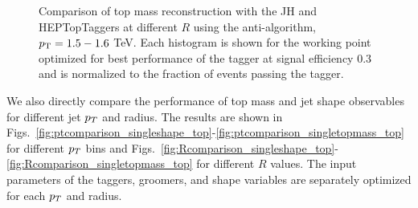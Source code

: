 \begin{figure}
\begin{center}
\caption{Comparison of top mass reconstruction with the JH and HEPTopTaggers at different $R$ using the anti-\kT algorithm, $p_{\rm T}=1.5-1.6$ TeV. Each histogram is shown for the working point optimized for best performance of the tagger at signal efficiency 0.3 and is normalized to the fraction of events passing the tagger.}
\label{fig:topmass_histogram_optall_HEP_JH}
\end{center}
\end{figure}




We also directly compare the performance of top mass and jet shape observables for different jet $p_T$ and radius. The results are shown in Figs.~\ref{fig:ptcomparison_singleshape_top}-\ref{fig:ptcomparison_singletopmass_top} for different $p_T$ bins and Figs.~\ref{fig:Rcomparison_singleshape_top}-\ref{fig:Rcomparison_singletopmass_top} for different $R$ values. The input parameters of the taggers, groomers, and shape variables are separately optimized for each $p_T$ and radius.\\

